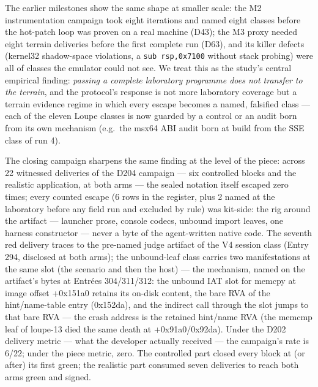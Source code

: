 \documentclass[11pt,a4paper]{article}
\newcommand{\code}[1]{\texttt{\small #1}}
\begin{document}
The earlier milestones show the same shape at smaller scale: the M2
instrumentation campaign took eight iterations and named eight classes
before the hot-patch loop was proven on a real machine (D43); the M3
proxy needed eight terrain deliveries before the first complete run
(D63), and its killer defects (kernel32 shadow-space violations, a
\code{sub rsp,0x7100} without stack probing) were all of classes the
emulator could not see. We treat this as the study's central empirical
finding: \emph{passing a complete laboratory programme does not transfer
to the terrain}, and the protocol's response is not more laboratory
coverage but a terrain evidence regime in which every escape becomes a
named, falsified class --- each of the eleven Loupe classes is now
guarded by a control or an audit born from its own mechanism (e.g.\ the
msx64 ABI audit born at build from the SSE class of run 4).

The closing campaign sharpens the same finding at the level of the
piece: across 22 witnessed deliveries of the D204 campaign --- six
controlled blocks and the realistic application, at both arms --- the
sealed notation itself escaped zero times; every counted escape
(6 rows in the register, plus 2 named at the laboratory before any
field run and excluded by rule) was kit-side: the rig around the
artifact --- launcher prose, console codecs, unbound import leaves,
one harness constructor --- never a byte of the agent-written native
code. The seventh red delivery traces to the pre-named judge artifact
of the V4 session class (Entry 294, disclosed at both arms); the
unbound-leaf class carries two manifestations at the same slot (the
scenario and then the host) --- the mechanism, named on the artifact's
bytes at Entr\'ees 304/311/312: the unbound IAT slot for memcpy at
image offset +0x151a0 retains its on-disk content, the bare RVA of the
hint/name-table entry (0x152da), and the indirect call through the
slot jumps to that bare RVA --- the crash address is the retained
hint/name RVA (the memcmp leaf of loupe-13 died the same death at
+0x91a0/0x92da). Under the D202 delivery metric --- what the developer
actually received --- the campaign's rate is 6/22; under the piece
metric, zero. The controlled part closed every block at (or after) its
first green; the realistic part consumed seven deliveries to reach
both arms green and signed.
\end{document}
